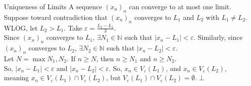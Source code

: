 \documentclass[8pt]{extarticle}
\newcommand{\N}{\mathbb{N}}
\begin{document}
  \begin{problem}{Uniqueness of Limits}
    A sequence $\left(x_n\right)_n$ can converge to at most one limit.
    \tcblower
    Suppose toward contradiction that $\left(x_n\right)_n$ converges to $L_1$ and $L_2$ with $L_1 \neq L_2$.\\

    WLOG, let $L_2 > L_1$. Take $\varepsilon = \frac{L_2 - L_1}{3}$. \\

    Since $(x_n)_n$ converges to $L_1$, $\exists N_1\in \N$ such that $|x_n - L_1| < \varepsilon$. Similarly, since $(x_n)_n$ converges to $L_2$, $\exists N_2\in \N$ such that $|x_n - L_2| < \varepsilon$.\\

    Let $N = \max{N_1,N_2}$. If $n \geq N$, then $n\geq N_1$ and $n\geq N_2$.\\

    So, $|x_n - L_1| < \varepsilon$ and $|x_n - L_2| < \varepsilon$. So, $x_n\in V_{\varepsilon}(L_1)$, and $x_n\in V_{\varepsilon}(L_2)$, meaning $x_n\in V_{\varepsilon}(L_1)\cap V_{\varepsilon}(L_2)$, but $V_{\varepsilon}(L_1)\cap V_{\varepsilon}(L_2) = \emptyset$. $\bot$
  \end{problem}
\end{document}
